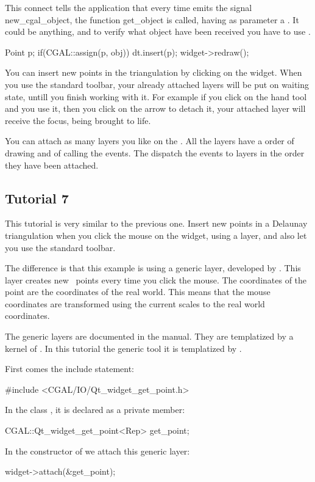 This connect tells the application that every time
 emits the signal new\_cgal\_object, the function
get\_object is called, having as parameter a . It could be
anything, and to verify what object have been received you have to use
.
\begin{ccExampleCode}
  Point p;
  if(CGAL::assign(p, obj)) {
      dt.insert(p);
      widget->redraw();
  }
\end{ccExampleCode}
You can insert new points in the triangulation by clicking on the
widget. When you use the standard toolbar, your already attached layers
will be put on waiting state, untill you finish working with it. For
example if you click on the hand tool and you use it, then you click
on the arrow to detach it, your attached layer will receive the
focus, being brought to life.

You can attach as many layers you like on the . All
the layers have a order of drawing and of calling the events. The
 dispatch the events to layers in the order they have
been attached.

\subsection*{Tutorial 7}

This tutorial is very similar to the previous one. Insert new points
in a Delaunay triangulation when you click the mouse on the widget,
using a layer, and also let you use the standard toolbar.

The difference is that this example is using a generic layer, developed
by \cgal. This layer creates new \cgal\ points every time you click the
mouse. The coordinates of the point are the coordinates of the real
world. This means that the mouse coordinates are transformed using the
current scales to the real world coordinates.

The generic layers are documented in the manual. They are templatized
by a kernel of \cgal. In this tutorial the generic tool
 it is templatized by
.

First comes the include statement:
\begin{ccExampleCode}
#include <CGAL/IO/Qt_widget_get_point.h>
\end{ccExampleCode}
In the class , it is declared as a private member:
\begin{ccExampleCode}
CGAL::Qt_widget_get_point<Rep> get_point;
\end{ccExampleCode}
In the constructor of  we attach this generic layer:
\begin{ccExampleCode}
widget->attach(&get_point);
\end{ccExampleCode}

